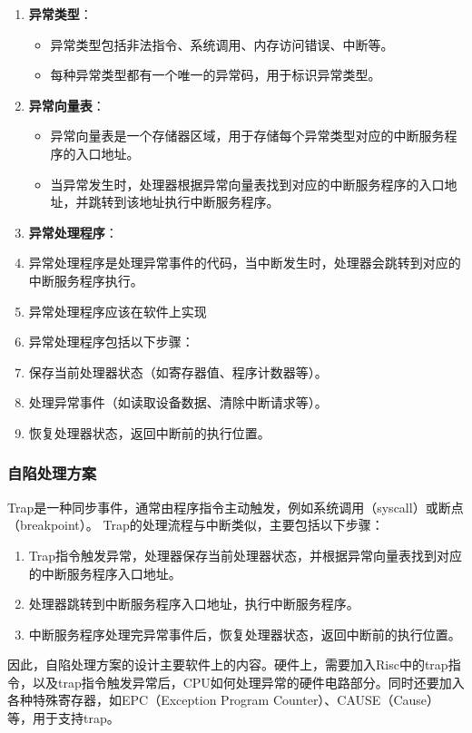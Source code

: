 \documentclass[12pt,hyperref,a4paper,UTF8]{ctexart}
\begin{document}
\begin{enumerate}
    \item \textbf{异常类型}：
    \begin{itemize}
        \item 异常类型包括非法指令、系统调用、内存访问错误、中断等。
        \item 每种异常类型都有一个唯一的异常码，用于标识异常类型。
    \end{itemize}

    \item \textbf{异常向量表}：
    \begin{itemize}
        \item 异常向量表是一个存储器区域，用于存储每个异常类型对应的中断服务程序的入口地址。
        \item 当异常发生时，处理器根据异常向量表找到对应的中断服务程序的入口地址，并跳转到该地址执行中断服务程序。
    \end{itemize}

    \item \textbf{异常处理程序}：
    \item 异常处理程序是处理异常事件的代码，当中断发生时，处理器会跳转到对应的中断服务程序执行。
    \item 异常处理程序应该在软件上实现
    \item 异常处理程序包括以下步骤：
    \item 保存当前处理器状态（如寄存器值、程序计数器等）。
    \item 处理异常事件（如读取设备数据、清除中断请求等）。
    \item 恢复处理器状态，返回中断前的执行位置。
\end{enumerate}

\subsubsection*{自陷处理方案}
\normalsize

Trap是一种同步事件，通常由程序指令主动触发，例如系统调用（syscall）或断点（breakpoint）。
Trap的处理流程与中断类似，主要包括以下步骤：
\begin{enumerate}
    \item Trap指令触发异常，处理器保存当前处理器状态，并根据异常向量表找到对应的中断服务程序入口地址。
    \item 处理器跳转到中断服务程序入口地址，执行中断服务程序。
    \item 中断服务程序处理完异常事件后，恢复处理器状态，返回中断前的执行位置。
\end{enumerate}
因此，自陷处理方案的设计主要软件上的内容。硬件上，需要加入Risc中的trap指令，以及trap指令触发异常后，CPU如何处理异常的硬件电路部分。同时还要加入各种特殊寄存器，如EPC（Exception Program Counter）、CAUSE（Cause）等，用于支持trap。
\end{document}
